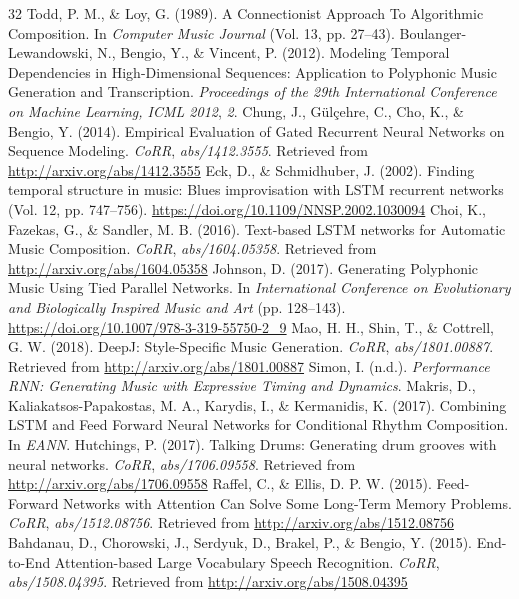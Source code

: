 \documentclass[sigconf]{nimeart}
\begin{document}
\begin{thebibliography}{32}
 {{ }}  Todd, P. M., \& Loy, G. (1989). A Connectionist Approach To Algorithmic Composition. In \emph{Computer Music Journal} (Vol. 13, pp. 27--43).{}
 {{ }}  Boulanger-Lewandowski, N., Bengio, Y., \& Vincent, P. (2012). Modeling Temporal Dependencies in High-Dimensional Sequences: Application to Polyphonic Music Generation and Transcription. \emph{Proceedings of the 29th International Conference on Machine Learning, ICML 2012}, \emph{2}.{}
 {{ }}  Chung, J., Gülçehre, C., Cho, K., \& Bengio, Y. (2014). Empirical Evaluation of Gated Recurrent Neural Networks on Sequence Modeling. \emph{CoRR}, \emph{abs/1412.3555}. Retrieved from \url{http://arxiv.org/abs/1412.3555}{}
 {{ }}  Eck, D., \& Schmidhuber, J. (2002). Finding temporal structure in music: Blues improvisation with LSTM recurrent networks (Vol. 12, pp. 747--756). \url{https://doi.org/10.1109/NNSP.2002.1030094}{}
 {{ }}  Choi, K., Fazekas, G., \& Sandler, M. B. (2016). Text-based LSTM networks for Automatic Music Composition. \emph{CoRR}, \emph{abs/1604.05358}. Retrieved from \url{http://arxiv.org/abs/1604.05358}{}
 {{ }}  Johnson, D. (2017). Generating Polyphonic Music Using Tied Parallel Networks. In \emph{International Conference on Evolutionary and Biologically Inspired Music and Art} (pp. 128--143). \url{https://doi.org/10.1007/978-3-319-55750-2_9}{}
 {{ }}  Mao, H. H., Shin, T., \& Cottrell, G. W. (2018). DeepJ: Style-Specific Music Generation. \emph{CoRR}, \emph{abs/1801.00887}. Retrieved from \url{http://arxiv.org/abs/1801.00887}{}
 {{ }}  Simon, I. (n.d.). \emph{Performance RNN: Generating Music with Expressive Timing and Dynamics}.{}
 {{ }}  Makris, D., Kaliakatsos-Papakostas, M. A., Karydis, I., \& Kermanidis, K. (2017). Combining LSTM and Feed Forward Neural Networks for Conditional Rhythm Composition. In \emph{EANN}.{}
 {{ }}  Hutchings, P. (2017). Talking Drums: Generating drum grooves with neural networks. \emph{CoRR}, \emph{abs/1706.09558}. Retrieved from \url{http://arxiv.org/abs/1706.09558}{}
 {{ }}  Raffel, C., \& Ellis, D. P. W. (2015). Feed-Forward Networks with Attention Can Solve Some Long-Term Memory Problems. \emph{CoRR}, \emph{abs/1512.08756}. Retrieved from \url{http://arxiv.org/abs/1512.08756}{}
 {{ }}  Bahdanau, D., Chorowski, J., Serdyuk, D., Brakel, P., \& Bengio, Y. (2015). End-to-End Attention-based Large Vocabulary Speech Recognition. \emph{CoRR}, \emph{abs/1508.04395}. Retrieved from \url{http://arxiv.org/abs/1508.04395}{}

\end{thebibliography}
\end{document}
